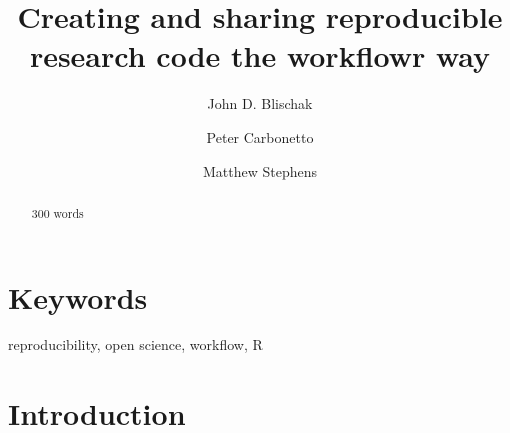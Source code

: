 \documentclass[9pt,a4paper]{extarticle}
\begin{document}
\pagestyle{front}

\title{Creating and sharing reproducible research code the workflowr
way}

\author[1]{John D. Blischak}

\author[1,2]{Peter Carbonetto}

\author[1,3]{Matthew Stephens}




\maketitle

\thispagestyle{front}

\begin{abstract}

300 words

\end{abstract}

\section*{Keywords}

reproducibility, open science, workflow, R

\clearpage

\pagestyle{main}


\section*{Introduction}
\end{document}
